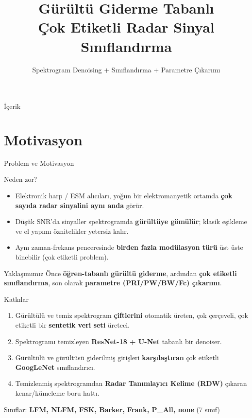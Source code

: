 \documentclass[aspectratio=169]{beamer}
\title[Radar Sinyal Sınıflandırma]{Gürültü Giderme Tabanlı\\ Çok Etiketli Radar Sinyal Sınıflandırma}
\subtitle{Spektrogram Denoising $+$ Sınıflandırma $+$ Parametre Çıkarımı}
\author{}
\institute{}
\date{}
\begin{document}
\begin{frame}[plain]
  \titlepage
\end{frame}

\begin{frame}{İçerik}
  \tableofcontents
\end{frame}

\section{Motivasyon}
\begin{frame}{Problem ve Motivasyon}
  \begin{block}{Neden zor?}
    \begin{itemize}
      \item Elektronik harp / ESM alıcıları, yoğun bir elektromanyetik ortamda
            \textbf{çok sayıda radar sinyalini aynı anda} görür.
      \item Düşük SNR'da sinyaller spektrogramda \textbf{gürültüye gömülür};
            klasik eşikleme ve el yapımı öznitelikler yetersiz kalır.
      \item Aynı zaman-frekans penceresinde \textbf{birden fazla modülasyon türü}
            üst üste binebilir (çok etiketli problem).
    \end{itemize}
  \end{block}
  \begin{block}{Yaklaşımımız}
    Önce \textbf{öğren-tabanlı gürültü giderme}, ardından \textbf{çok etiketli
    sınıflandırma}, son olarak \textbf{parametre (PRI/PW/BW/Fc) çıkarımı}.
  \end{block}
\end{frame}

\begin{frame}{Katkılar}
  \begin{enumerate}
    \item Gürültülü ve temiz spektrogram \textbf{çiftlerini} otomatik üreten,
          çok çerçeveli, çok etiketli bir \textbf{sentetik veri seti} üreteci.
    \item Spektrogramı temizleyen \textbf{ResNet-18 + U-Net} tabanlı bir denoiser.
    \item Gürültülü ve gürültüsü giderilmiş girişleri \textbf{karşılaştıran}
          çok etiketli \textbf{GoogLeNet} sınıflandırıcı.
    \item Temizlenmiş spektrogramdan \textbf{Radar Tanımlayıcı Kelime (RDW)}
          çıkaran kenar/kümeleme boru hattı.
  \end{enumerate}
  \vfill
  \begin{center}\small
  Sınıflar: \textbf{LFM, NLFM, FSK, Barker, Frank, P\_All, none} (7 sınıf)
  \end{center}
\end{frame}
\end{document}
